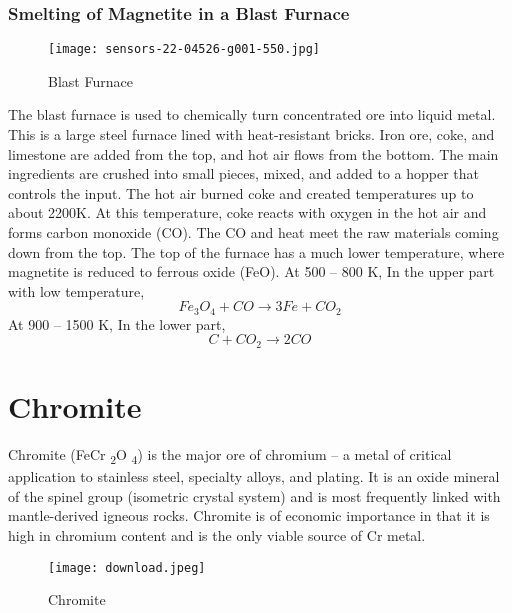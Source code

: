\documentclass[12pt,a4paper, top=1.9cm, bottom=2.03cm, left=3.81cm, right=1.9cm]{article}
\begin{document}
\subsubsection{Smelting of Magnetite in a Blast Furnace}
\begin{figure}[h!]
        \centering
        \texttt{[image: sensors-22-04526-g001-550.jpg]}  %
        \caption{Blast Furnace}
    \end{figure}
\noindent\fontsize{12}{14}\selectfont The blast furnace is used to chemically turn concentrated ore into liquid metal. This is a large steel furnace lined with heat-resistant bricks. Iron ore, coke, and limestone are added from the top, and hot air flows from the bottom. The main ingredients are crushed into small pieces, mixed, and added to a hopper that controls the input. The hot air burned coke and created temperatures up to about 2200K. At this temperature, coke reacts with oxygen in the hot air and forms carbon monoxide (CO). The CO and heat meet the raw materials coming down from the top. The top of the furnace has a much lower temperature, where magnetite is reduced to ferrous oxide (FeO).
\noindent\fontsize{12}{14}\selectfont At 500 – 800 K, In the upper part with low temperature,
\[Fe_3O_4 + CO \rightarrow 3 Fe + CO_2\]
\noindent\fontsize{12}{14}\selectfont At 900 – 1500 K, In the lower part,
\[C + CO_2\rightarrow2CO\]
\newpage
\section{Chromite}
\noindent\fontsize{12}{14}\selectfont Chromite (FeCr \textsubscript{2}O \textsubscript{4}) is the major ore of chromium – a metal of critical application to stainless steel, specialty alloys, and plating. It is an oxide mineral of the spinel group (isometric crystal system) and is most frequently linked with mantle-derived igneous rocks. Chromite is of economic importance in that it is high in chromium content and is the only viable source of Cr metal.
\begin{figure}[h!]
        \centering
        \texttt{[image: download.jpeg]}  %
        \caption{Chromite}
    \end{figure}
\end{document}
